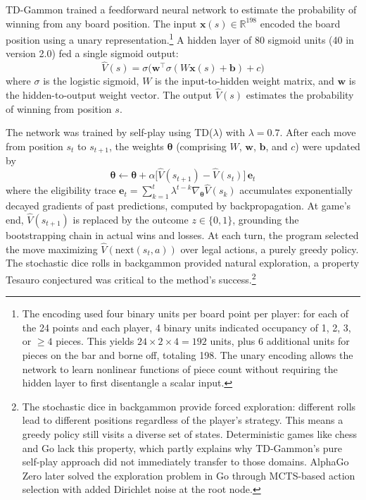 TD-Gammon trained a feedforward neural network to estimate the probability of winning from any board position. The input $\mathbf{x}(s) \in \mathbb{R}^{198}$ encoded the board position using a unary representation.\footnote{The encoding used four binary units per board point per player: for each of the 24 points and each player, 4 binary units indicated occupancy of 1, 2, 3, or $\geq 4$ pieces. This yields $24 \times 2 \times 4 = 192$ units, plus 6 additional units for pieces on the bar and borne off, totaling 198. The unary encoding allows the network to learn nonlinear functions of piece count without requiring the hidden layer to first disentangle a scalar input.} A hidden layer of 80 sigmoid units (40 in version 2.0) fed a single sigmoid output:
\begin{equation}
\hat{V}(s) = \sigma\!\bigl(\mathbf{w}^\top \sigma(W\mathbf{x}(s) + \mathbf{b}) + c\bigr)
\end{equation}
where $\sigma$ is the logistic sigmoid, $W$ is the input-to-hidden weight matrix, and $\mathbf{w}$ is the hidden-to-output weight vector. The output $\hat{V}(s)$ estimates the probability of winning from position $s$.

The network was trained by self-play using TD($\lambda$) with $\lambda = 0.7$. After each move from position $s_t$ to $s_{t+1}$, the weights $\boldsymbol{\theta}$ (comprising $W$, $\mathbf{w}$, $\mathbf{b}$, and $c$) were updated by
\begin{equation}
\boldsymbol{\theta} \leftarrow \boldsymbol{\theta} + \alpha \bigl[\hat{V}(s_{t+1}) - \hat{V}(s_t)\bigr] \, \mathbf{e}_t
\end{equation}
where the eligibility trace $\mathbf{e}_t = \sum_{k=1}^{t} \lambda^{t-k} \nabla_{\boldsymbol{\theta}} \hat{V}(s_k)$ accumulates exponentially decayed gradients of past predictions, computed by backpropagation. At game's end, $\hat{V}(s_{t+1})$ is replaced by the outcome $z \in \{0, 1\}$, grounding the bootstrapping chain in actual wins and losses. At each turn, the program selected the move maximizing $\hat{V}(\mathrm{next}(s_t, a))$ over legal actions, a purely greedy policy. The stochastic dice rolls in backgammon provided natural exploration, a property Tesauro conjectured was critical to the method's success.\footnote{The stochastic dice in backgammon provide forced exploration: different rolls lead to different positions regardless of the player's strategy. This means a greedy policy still visits a diverse set of states. Deterministic games like chess and Go lack this property, which partly explains why TD-Gammon's pure self-play approach did not immediately transfer to those domains. AlphaGo Zero later solved the exploration problem in Go through MCTS-based action selection with added Dirichlet noise at the root node.}

